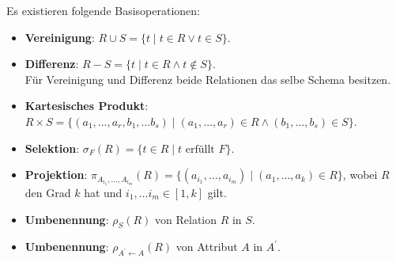 \documentclass[a4paper,parskip=half*,DIV=15,fontsize=11pt]{scrartcl}
\begin{document}
Es existieren folgende Basisoperationen:
\begin{itemize}
\item \textbf{Vereinigung}: $R \cup S = \{t \;|\; t \in R \lor t \in S\}$.
\item \textbf{Differenz}: $R - S = \{t \;|\; t \in R \land t \notin S\}$.   \\
Für Vereinigung und Differenz beide Relationen das selbe Schema besitzen.
\item \textbf{Kartesisches Produkt}: $R \times S = \{(a_1, \ldots, a_r, b_1, \ldots b_s) \;|\; (a_1, \ldots, a_r) \in R \land (b_1, \ldots, b_s) \in S\}$.
\item \textbf{Selektion}: $\sigma_F(R) = \{t \in R \;|\; t \text{ erfüllt } F\}$.
\item \textbf{Projektion}: $\pi_{A_{i_1}, \ldots, A_{i_m}}(R) = \{(a_{i_1}, \ldots, a_{i_m}) \;|\;(a_1, \ldots, a_k) \in R\}$, wobei $R$ den Grad $k$ hat und $i_1, \ldots i_m \in [1,k]$ gilt.
\item \textbf{Umbenennung}: $\rho_S(R)$ von Relation $R$ in $S$.
\item \textbf{Umbenennung}: $\rho_{A^\prime \leftarrow A}(R)$ von Attribut $A$ in $A^\prime$.
\end{itemize}
\end{document}
